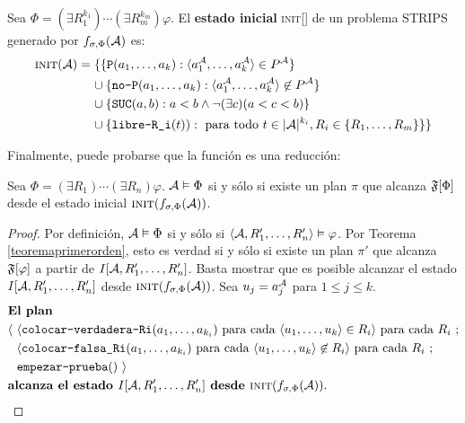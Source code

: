 \begin{definition}
Sea $\Phi = (\exists R_1^{k_1})\cdots(\exists R_m^{k_m}) \varphi$.
El \textbf{estado inicial} \textsc{init}[\A] de un problema STRIPS generado por
$f_{\sigma,\Phi}(\mathcal{A})$ es:
\begin{alignat*}{1}
& \textsc{init}(\A) = \{\{ \texttt{P}(a_1,\ldots,a_k) :
\tup{a_1^\A,\ldots,a_k^\A} \in P^\A\}\\
& {\color{white} \texttt{init}[\A] = } \cup \{\texttt{no-P}(a_1,\ldots,a_k) : \tup{a_1^\A,\ldots,a_k^\A} \not\in P^\A\}\\
& {\color{white} \texttt{init}[\A] = } \cup \{\texttt{SUC}(a, b): a < b \land \neg (\exists c) (a < c < b)\}\\
& {\color{white} \texttt{init}[\A] = } \cup \{\texttt{libre-R\_i}(t)) : \text{ para todo $t \in |\A|^{k_i}$},
R_i\in\{R_1,\ldots,R_m\}\} \}
\end{alignat*}
\end{definition}

Finalmente, puede probarse que la función es una reducción:
\begin{theorem}
Sea $\Phi = (\exists R_1)\cdots(\exists R_n) \varphi$.
$\mathcal{A} \vDash \Phi$ si y sólo si existe un plan $\pi$ que alcanza $\mathfrak{F}[\Phi]$
desde el estado inicial $\textsc{init}(f_{\sigma,\Phi}(\mathcal{A}))$.
\end{theorem}
\begin{proof}
Por definición, $\mathcal{A} \vDash \Phi$ si y sólo si
$\langle \mathcal{A}, R_1',\ldots,R_n' \rangle \vDash \varphi$.
Por Teorema \ref{teoremaprimerorden}, esto es verdad si y sólo si 
existe un plan $\pi'$ que alcanza $\mathfrak{F}[\varphi]$ a partir de $I[\mathcal{A},
R_1',\ldots,R_n']$.
Basta mostrar que es posible alcanzar el estado $I[\mathcal{A}, R_1',\ldots,R_n']$ desde
$\textsc{init}(f_{\sigma,\Phi}(\mathcal{A}))$. Sea $u_j = a_j^{\mathcal{A}}$ para $1 \leq j \leq k$.
\begin{alignat*}{1}
& \textbf{El plan }\\
& \langle \ \tup{\texttt{colocar-verdadera-Ri}(a_1,\ldots,a_{k_i}) 
\text{ para cada } \tup{u_1,\ldots,u_k} \in R_i} \text{ para cada } R_i \ ;\\
& {\color{white} \langle \ } \tup{\texttt{colocar-falsa\_Ri}(a_1,\ldots,a_{k_i}) \text { para cada
} \tup{u_1,\ldots,u_k} \not\in R_i} \text{ para cada } R_i\ ;\\
& {\color{white} \langle \ } \texttt{empezar-prueba}()\ \rangle\\
& \textbf{alcanza el estado } I[\A, R_1',\ldots,R_n'] \textbf{ desde }
\textsc{init}(f_{\sigma,\Phi}(\A)).
\end{alignat*}
\end{proof}

